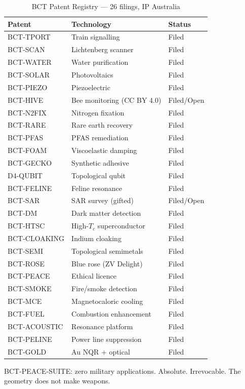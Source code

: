 \documentclass[aps,prl,twocolumn,showpacs,preprintnumbers]{revtex4-2}
\begin{document}
\begin{table}[h]
\centering
\caption{BCT Patent Registry --- 26 filings, IP Australia}
\begin{tabular}{lll}
\toprule
Patent & Technology & Status \\
\midrule
BCT-TPORT & Train signalling & Filed \\
BCT-SCAN & Lichtenberg scanner & Filed \\
BCT-WATER & Water purification & Filed \\
BCT-SOLAR & Photovoltaics & Filed \\
BCT-PIEZO & Piezoelectric & Filed \\
BCT-HIVE & Bee monitoring (CC BY 4.0) & Filed/Open \\
BCT-N2FIX & Nitrogen fixation & Filed \\
BCT-RARE & Rare earth recovery & Filed \\
BCT-PFAS & PFAS remediation & Filed \\
BCT-FOAM & Viscoelastic damping & Filed \\
BCT-GECKO & Synthetic adhesive & Filed \\
D4-QUBIT & Topological qubit & Filed \\
BCT-FELINE & Feline resonance & Filed \\
BCT-SAR & SAR survey (gifted) & Filed/Open \\
BCT-DM & Dark matter detection & Filed \\
BCT-HTSC & High-$T_c$ superconductor & Filed \\
BCT-CLOAKING & Indium cloaking & Filed \\
BCT-SEMI & Topological semimetals & Filed \\
BCT-ROSE & Blue rose (ZV Delight) & Filed \\
BCT-PEACE & Ethical licence & Filed \\
BCT-SMOKE & Fire/smoke detection & Filed \\
BCT-MCE & Magnetocaloric cooling & Filed \\
BCT-FUEL & Combustion enhancement & Filed \\
BCT-ACOUSTIC & Resonance platform & Filed \\
BCT-PELINE & Power line suppression & Filed \\
BCT-GOLD & Au NQR + optical & Filed \\
\bottomrule
\end{tabular}
\end{table}

\noindent BCT-PEACE-SUITE: zero military applications.
Absolute. Irrevocable. The geometry does not make weapons.
\end{document}
